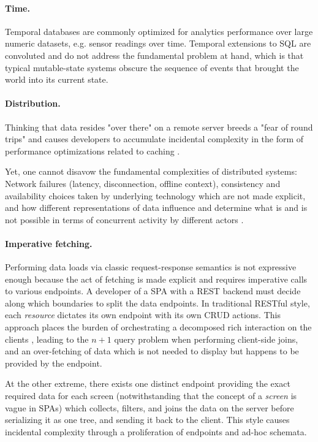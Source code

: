 \paragraph{Time.}
Temporal databases are commonly optimized for analytics performance over large numeric datasets, e.g. sensor readings over time. Temporal extensions to SQL \cite{kulkarni2012temporal} are convoluted and do not address the fundamental problem at hand, which is that typical mutable-state systems obscure the sequence of events that brought the world into its current state.

\paragraph{Distribution.}
Thinking that data resides "over there" on a remote server breeds a "fear of round trips" and causes developers to accumulate incidental complexity in the form of performance optimizations related to caching \cite{hickey2012dbvalue}.

Yet, one cannot disavow the fundamental complexities of distributed systems: Network failures (latency, disconnection, offline context), consistency and availability choices taken by underlying technology which are not made explicit, and how different representations of data influence and determine what is and is not possible in terms of concurrent activity by different actors \cite{emerick2014api}.

\paragraph{Imperative fetching.}
Performing data loads via classic request-response semantics is not expressive enough because the act of fetching is made explicit and requires imperative calls to various endpoints. A developer of a \gls{SPA} with a \gls{REST} backend must decide along which boundaries to split the data endpoints. In traditional RESTful style, each \emph{resource} dictates its own endpoint with its own \gls{CRUD} actions. This approach places the burden of orchestrating a decomposed rich interaction on the clients \cite{calderwood15cqrs}, leading to the $n+1$ query problem when performing client-side joins, and an over-fetching of data which is not needed to display but happens to be provided by the endpoint.

At the other extreme, there exists one distinct endpoint providing the exact required data for each screen (notwithstanding that the concept of a \emph{screen} is vague in SPAs) which collects, filters, and joins the data on the server before serializing it as one tree, and sending it back to the client. This style causes incidental complexity through a proliferation of endpoints and ad-hoc schemata.


